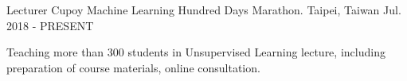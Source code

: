 

\begin{cventries}

  \cventry
    {Lecturer} %
    {Cupoy Machine Learning Hundred Days Marathon.} %
    {Taipei, Taiwan} %
    {Jul. 2018 - PRESENT} %
    {
      \begin{cvitems} %
        \item {Teaching more than 300 students in Unsupervised Learning lecture, including preparation of course materials, online consultation.}
      \end{cvitems}
    }


\end{cventries}

